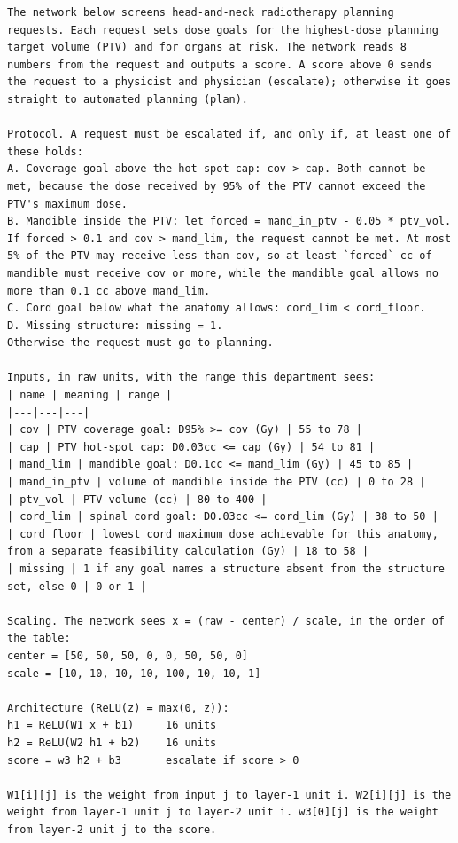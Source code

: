 \documentclass[aps,prx,reprint,superscriptaddress,nofootinbib]{revtex4-2}
\begin{document}
\begin{Verbatim}[fontsize=\footnotesize,breaklines=true,breaksymbolleft={},breakindent=1em,frame=leftline,framerule=0.5pt,rulecolor=\color{rulegray},framesep=3mm,xleftmargin=1mm]
The network below screens head-and-neck radiotherapy planning requests. Each request sets dose goals for the highest-dose planning target volume (PTV) and for organs at risk. The network reads 8 numbers from the request and outputs a score. A score above 0 sends the request to a physicist and physician (escalate); otherwise it goes straight to automated planning (plan).

Protocol. A request must be escalated if, and only if, at least one of these holds:
A. Coverage goal above the hot-spot cap: cov > cap. Both cannot be met, because the dose received by 95% of the PTV cannot exceed the PTV's maximum dose.
B. Mandible inside the PTV: let forced = mand_in_ptv - 0.05 * ptv_vol. If forced > 0.1 and cov > mand_lim, the request cannot be met. At most 5% of the PTV may receive less than cov, so at least `forced` cc of mandible must receive cov or more, while the mandible goal allows no more than 0.1 cc above mand_lim.
C. Cord goal below what the anatomy allows: cord_lim < cord_floor.
D. Missing structure: missing = 1.
Otherwise the request must go to planning.

Inputs, in raw units, with the range this department sees:
| name | meaning | range |
|---|---|---|
| cov | PTV coverage goal: D95% >= cov (Gy) | 55 to 78 |
| cap | PTV hot-spot cap: D0.03cc <= cap (Gy) | 54 to 81 |
| mand_lim | mandible goal: D0.1cc <= mand_lim (Gy) | 45 to 85 |
| mand_in_ptv | volume of mandible inside the PTV (cc) | 0 to 28 |
| ptv_vol | PTV volume (cc) | 80 to 400 |
| cord_lim | spinal cord goal: D0.03cc <= cord_lim (Gy) | 38 to 50 |
| cord_floor | lowest cord maximum dose achievable for this anatomy, from a separate feasibility calculation (Gy) | 18 to 58 |
| missing | 1 if any goal names a structure absent from the structure set, else 0 | 0 or 1 |

Scaling. The network sees x = (raw - center) / scale, in the order of the table:
center = [50, 50, 50, 0, 0, 50, 50, 0]
scale = [10, 10, 10, 10, 100, 10, 10, 1]

Architecture (ReLU(z) = max(0, z)):
h1 = ReLU(W1 x + b1)     16 units
h2 = ReLU(W2 h1 + b2)    16 units
score = w3 h2 + b3       escalate if score > 0

W1[i][j] is the weight from input j to layer-1 unit i. W2[i][j] is the weight from layer-1 unit j to layer-2 unit i. w3[0][j] is the weight from layer-2 unit j to the score.


\end{Verbatim}
\end{document}
